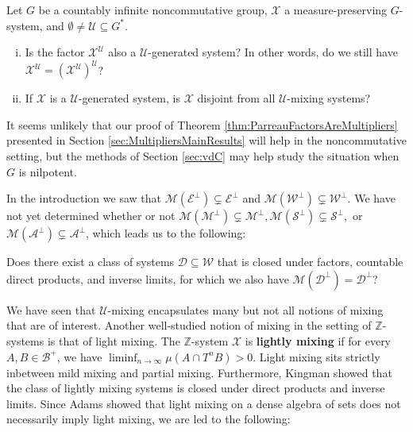 \documentclass[graybox]{svmult}
\theoremstyle{definition}
\begin{document}
\begin{question}\label{Q:NonCommutativeParreau}
    Let $G$ be a countably infinite noncommutative group, $\mathcal{X}$ a measure-preserving $G$-system, and $\emptyset \neq \mathcal{U} \subseteq G^*$.
    \begin{enumerate}[(i)]
        \item Is the factor $\mathcal{X}^\mathcal{U}$ also a $\mathcal{U}$-generated system? In other words, do we still have  $\mathcal X^{\mathcal U}=(\mathcal X^{\mathcal U})^\mathcal U$?

        \item If $\mathcal{X}$ is a $\mathcal{U}$-generated system, is $\mathcal{X}$ disjoint from all $\mathcal{U}$-mixing systems?
    \end{enumerate}
\end{question}

It seems unlikely that our proof of Theorem \ref{thm:ParreauFactorsAreMultipliers} presented in Section \ref{sec:MultipliersMainResults} will help in the noncommutative setting, but the methods of Section \ref{sec:vdC} may help study the situation when $G$ is nilpotent.

In the introduction we saw that $\mathscr{M}(\mathcal{E}^\perp) \subsetneq \mathcal{E}^\perp$ and $\mathscr{M}(\mathcal{W}^\perp) \subsetneq \mathcal{W}^\perp$.
We have not yet determined whether or not $\mathscr{M}(\mathcal{M}^\perp) \subsetneq \mathcal{M}^\perp, \mathscr{M}(\mathcal{S}^\perp) \subsetneq \mathcal{S}^\perp,$ or $\mathscr{M}(\mathcal{A}^\perp) \subsetneq \mathcal{A}^\perp$, which leads us to the following:

\begin{question}\label{Q:Multipliers}
    Does there exist a class of systems $\mathscr{D} \subseteq \mathcal{W}$ that is closed under factors, countable direct products, and inverse limits, for which we also have $\mathscr{M}(\mathscr{D}^\perp) = \mathscr{D}^\perp$?
\end{question}

We have seen that $\mathcal{U}$-mixing encapsulates many but not all notions of mixing that are of interest. 
Another well-studied notion of mixing in the setting of $\mathbb{Z}$-systems is that of light mixing.
The $\mathbb{Z}$-system $\mathcal{X}$ is \textbf{lightly mixing} if for every $A,B \in \mathscr{B}^+$, we have $\liminf_{n\rightarrow\infty}\mu(A\cap T^nB) > 0$.
Light mixing sits strictly inbetween mild mixing and partial mixing.
Furthermore, Kingman \cite{LightlyMixingIsClosedUnderCountableProducts} showed that the class of lightly mixing systems is closed under direct products and inverse limits.
Since Adams \cite{DenseLMixingIsNotLMixing} showed that light mixing on a dense algebra of sets does not necessarily imply light mixing, we are led to the following:
\end{document}
